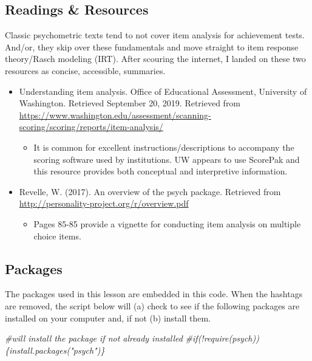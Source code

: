 \documentclass[
  english,
]{book}
\newenvironment{Shaded}{\begin{snugshade}}{\end{snugshade}}
\newcommand{\CommentTok}[1]{\textcolor[rgb]{0.56,0.35,0.01}{\textit{#1}}}
\providecommand{\tightlist}{%
  \setlength{\itemsep}{0pt}\setlength{\parskip}{0pt}}
\begin{document}
\hypertarget{readings-resources-4}{%
\subsection{Readings \& Resources}\label{readings-resources-4}}

Classic psychometric texts tend to not cover item analysis for achievement tests. And/or, they skip over these fundamentals and move straight to item response theory/Rasch modeling (IRT). After scouring the internet, I landed on these two resources as concise, accessible, summaries.

\begin{itemize}
\tightlist
\item
  Understanding item analysis. Office of Educational Assessment, University of Washington. Retrieved September 20, 2019. Retrieved from \url{https://www.washington.edu/assessment/scanning-scoring/scoring/reports/item-analysis/}

  \begin{itemize}
  \tightlist
  \item
    It is common for excellent instructions/descriptions to accompany the scoring software used by institutions. UW appears to use ScorePak and this resource provides both conceptual and interpretive information.
  \end{itemize}
\item
  Revelle, W. (2017). An overview of the psych package. Retrieved from \url{http://personality-project.org/r/overview.pdf}

  \begin{itemize}
  \tightlist
  \item
    Pages 85-85 provide a vignette for conducting item analysis on multiple choice items.
  \end{itemize}
\end{itemize}

\hypertarget{packages-4}{%
\subsection{Packages}\label{packages-4}}

The packages used in this lesson are embedded in this code. When the hashtags are removed, the script below will (a) check to see if the following packages are installed on your computer and, if not (b) install them.

\begin{Shaded}
\begin{Highlighting}[]
\CommentTok{\#will install the package if not already installed}
\CommentTok{\#if(!require(psych))\{install.packages("psych")\}}
\end{Highlighting}
\end{Shaded}
\end{document}
